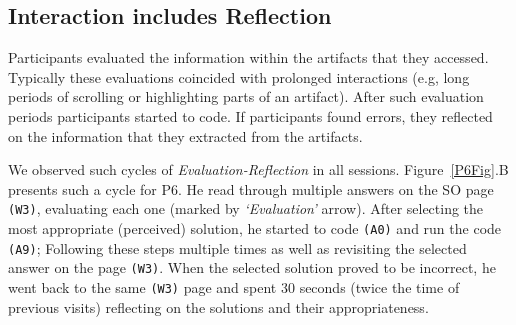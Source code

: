 
\subsection{Interaction includes Reflection}


Participants evaluated the information within the artifacts that they accessed. Typically these evaluations coincided with prolonged interactions (e.g, long periods of scrolling or highlighting parts of an artifact). After such evaluation periods participants started to code. If participants found errors, they reflected on the information that they extracted from the artifacts.

We observed such cycles of \textit{Evaluation-Reflection} in all sessions. Figure~\ref{P6Fig}.B presents such a cycle for P6. He read through multiple answers on the SO page \texttt{(W3)}, evaluating each one (marked by \textit{`Evaluation'} arrow). After selecting the most appropriate (perceived) solution, he started to code \texttt{(A0)} and run the code \texttt{(A9)}; Following these steps multiple times as well as revisiting the selected answer on the page \texttt{(W3)}. When the selected solution proved to be incorrect, he went back to the same \texttt{(W3)} page and spent 30 seconds (twice the time of previous visits) reflecting on the solutions and their appropriateness.


